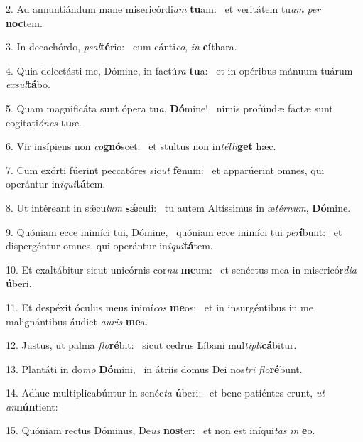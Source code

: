 2. Ad annuntiándum mane misericórdi\textit{am} \textbf{tu}am: \ast\  et veritátem tu\textit{am} \textit{per} \textbf{noc}tem.\

3. In decachórdo, \textit{psal}\textbf{té}rio: \ast\  cum cánti\textit{co}, \textit{in} \textbf{cí}thara.\

4. Quia delectásti me, Dómine, in factú\textit{ra} \textbf{tu}a: \ast\  et in opéribus mánuum tuárum \textit{ex}\textit{sul}\textbf{tá}bo.\

5. Quam magnificáta sunt ópera tu\textit{a}, \textbf{Dó}mine! \ast\  nimis profúndæ factæ sunt cogitati\textit{ó}\textit{nes} \textbf{tu}æ.\

6. Vir insípiens non \textit{co}\textbf{gnó}scet: \ast\  et stultus non in\textit{tél}\textit{li}\textbf{get} hæc.\

7. Cum exórti fúerint peccatóres sic\textit{ut} \textbf{fe}num: \ast\  et apparúerint omnes, qui operántur in\textit{i}\textit{qui}\textbf{tá}tem.\

8. Ut intéreant in sǽcu\textit{lum} \textbf{sǽ}culi: \ast\  tu autem Altíssimus in æ\textit{tér}\textit{num}, \textbf{Dó}mine.\

9. Quóniam ecce inimíci tui, Dómine, \dag\  quóniam ecce inimíci tui \textit{per}\textbf{í}bunt: \ast\  et dispergéntur omnes, qui operántur in\textit{i}\textit{qui}\textbf{tá}tem.\

10. Et exaltábitur sicut unicórnis cor\textit{nu} \textbf{me}um: \ast\  et senéctus mea in misericór\textit{di}\textit{a} \textbf{ú}beri.\

11. Et despéxit óculus meus inimí\textit{cos} \textbf{me}os: \ast\  et in insurgéntibus in me malignántibus áudiet \textit{au}\textit{ris} \textbf{me}a.\

12. Justus, ut palma \textit{flo}\textbf{ré}bit: \ast\  sicut cedrus Líbani mul\textit{ti}\textit{pli}\textbf{cá}bitur.\

13. Plantáti in do\textit{mo} \textbf{Dó}mini, \ast\  in átriis domus Dei nos\textit{tri} \textit{flo}\textbf{ré}bunt.\

14. Adhuc multiplicabúntur in senéc\textit{ta} \textbf{ú}beri: \ast\  et bene patiéntes erunt, \textit{ut} \textit{an}\textbf{nún}tient:\

15. Quóniam rectus Dóminus, De\textit{us} \textbf{nos}ter: \ast\  et non est iníqui\textit{tas} \textit{in} \textbf{e}o.\

